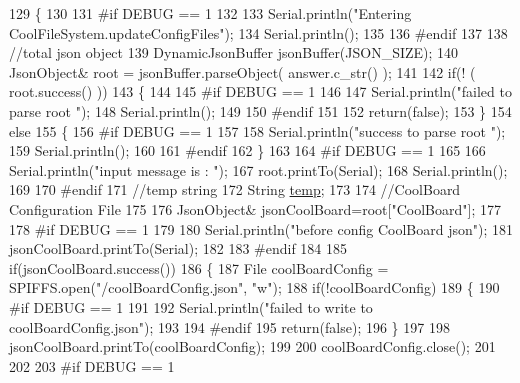 \begin{DoxyCode}
129 \{
130 
131 \textcolor{preprocessor}{#if DEBUG == 1}
132 
133     Serial.println(\textcolor{stringliteral}{"Entering CoolFileSystem.updateConfigFiles"});
134     Serial.println();
135 
136 \textcolor{preprocessor}{#endif}
137 
138     \textcolor{comment}{//total json object }
139     DynamicJsonBuffer jsonBuffer(JSON\_SIZE);
140     JsonObject& root = jsonBuffer.parseObject( answer.c\_str() );
141     
142     \textcolor{keywordflow}{if}(! ( root.success() ))
143     \{
144     
145 \textcolor{preprocessor}{    #if DEBUG == 1}
146 
147         Serial.println(\textcolor{stringliteral}{"failed to parse root "});
148         Serial.println();
149     
150 \textcolor{preprocessor}{    #endif}
151 
152         \textcolor{keywordflow}{return}(\textcolor{keyword}{false});
153     \}
154     \textcolor{keywordflow}{else}
155     \{
156 \textcolor{preprocessor}{    #if DEBUG == 1}
157         
158         Serial.println(\textcolor{stringliteral}{"success to parse root "});
159         Serial.println();
160         
161 \textcolor{preprocessor}{    #endif  }
162     \}
163     
164 \textcolor{preprocessor}{#if DEBUG == 1}
165 
166     Serial.println(\textcolor{stringliteral}{"input message is : "});
167     root.printTo(Serial);
168     Serial.println();
169 
170 \textcolor{preprocessor}{#endif}
171     \textcolor{comment}{//temp string}
172     String \hyperlink{Irene3000_8h_a5905d48604152cf57aa6bfa087b49173}{temp};
173 
174     \textcolor{comment}{//CoolBoard Configuration File}
175 
176         JsonObject& jsonCoolBoard=root[\textcolor{stringliteral}{"CoolBoard"}];
177 
178 \textcolor{preprocessor}{#if DEBUG == 1}
179 
180     Serial.println(\textcolor{stringliteral}{"before config CoolBoard json"});
181     jsonCoolBoard.printTo(Serial);
182 
183 \textcolor{preprocessor}{#endif}
184 
185     \textcolor{keywordflow}{if}(jsonCoolBoard.success())
186     \{
187         File coolBoardConfig = SPIFFS.open(\textcolor{stringliteral}{"/coolBoardConfig.json"}, \textcolor{stringliteral}{"w"});   
188         \textcolor{keywordflow}{if}(!coolBoardConfig)
189         \{   
190 \textcolor{preprocessor}{        #if DEBUG == 1}
191             
192             Serial.println(\textcolor{stringliteral}{"failed to write to coolBoardConfig.json"});
193 
194 \textcolor{preprocessor}{        #endif}
195             \textcolor{keywordflow}{return}(\textcolor{keyword}{false});
196         \}
197         
198         jsonCoolBoard.printTo(coolBoardConfig);
199         
200         coolBoardConfig.close();
201 
202 
203 \textcolor{preprocessor}{    #if DEBUG == 1}

\end{DoxyCode}
